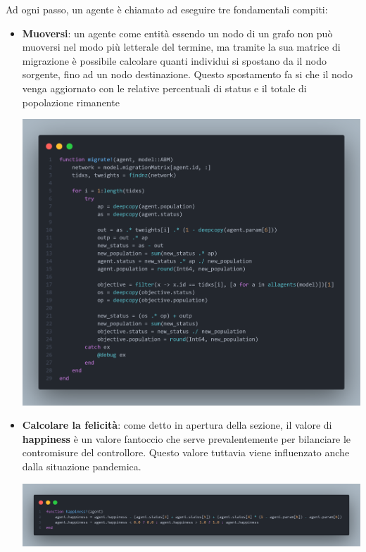 Ad ogni passo, un agente è chiamato ad eseguire tre fondamentali compiti:
\begin{itemize}
	\item \textbf{Muoversi}: un agente come entità essendo un nodo di un grafo non può
	muoversi nel modo più letterale del termine, ma tramite la sua matrice di migrazione 
	è possibile calcolare quanti individui si spostano da il nodo sorgente, fino ad un nodo
	destinazione. Questo spostamento fa si che il nodo venga aggiornato con le relative percentuali
	di status e il totale di popolazione rimanente

	\begin{minipage}{\linewidth}
		\centering
		\includegraphics[width=\textwidth]{img/migratef.png}
		\label{fig:migrationf}
	\end{minipage}

	\item \textbf{Calcolare la felicità}: come detto in apertura della sezione, il valore di \textbf{happiness}
	è un valore fantoccio che serve prevalentemente per bilanciare le contromisure del controllore.
	Questo valore tuttavia viene influenzato anche dalla situazione pandemica. 
	
	\begin{minipage}{\linewidth}
		\centering
		\includegraphics[width=\textwidth]{img/happiness.png}
		\label{fig:happinessf}
	\end{minipage}


\end{itemize}
